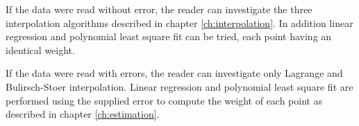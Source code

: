 \documentclass[twoside]{book}
\begin{document}
If the data were read without error, the reader can investigate
the three interpolation algorithms described in chapter
\ref{ch:interpolation}. In addition linear regression and
polynomial least square fit can be tried, each point having an
identical weight.

If the data were read with errors, the reader can investigate only
Lagrange and Bulirsch-Stoer interpolation. Linear regression and
polynomial least square fit are performed using the supplied error
to compute the weight of each point as described in chapter
\ref{ch:estimation}.

\ifx\wholebook\relax\else
\end{document}
